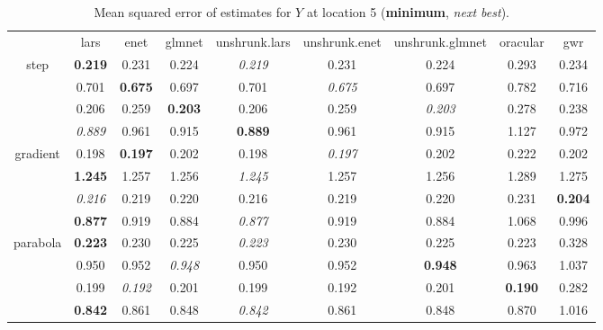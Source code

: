 \documentclass[authoryear, review, 11pt]{elsarticle}
\begin{document}
\begin{table}[ht]
\begin{center}
\begin{tabular}{ccccccccc}
  & lars & enet & glmnet & unshrunk.lars & unshrunk.enet & unshrunk.glmnet & oracular & gwr \\ 
  \cline{2-9}
  \multirow{4}{*}{step} & \textbf{0.219} & 0.231 & 0.224 & \emph{0.219} & 0.231 & 0.224 & 0.293 & 0.234 \\ 
  & 0.701 & \textbf{0.675} & 0.697 & 0.701 & \emph{0.675} & 0.697 & 0.782 & 0.716 \\ 
  & 0.206 & 0.259 & \textbf{0.203} & 0.206 & 0.259 & \emph{0.203} & 0.278 & 0.238 \\ 
  & \emph{0.889} & 0.961 & 0.915 & \textbf{0.889} & 0.961 & 0.915 & 1.127 & 0.972 \\ 
  \cline{2-9}
  \multirow{4}{*}{gradient} & 0.198 & \textbf{0.197} & 0.202 & 0.198 & \emph{0.197} & 0.202 & 0.222 & 0.202 \\ 
  & \textbf{1.245} & 1.257 & 1.256 & \emph{1.245} & 1.257 & 1.256 & 1.289 & 1.275 \\ 
  & \emph{0.216} & 0.219 & 0.220 & 0.216 & 0.219 & 0.220 & 0.231 & \textbf{0.204} \\ 
  & \textbf{0.877} & 0.919 & 0.884 & \emph{0.877} & 0.919 & 0.884 & 1.068 & 0.996 \\ 
  \cline{2-9}
  \multirow{4}{*}{parabola} & \textbf{0.223} & 0.230 & 0.225 & \emph{0.223} & 0.230 & 0.225 & 0.223 & 0.328 \\ 
  & 0.950 & 0.952 & \emph{0.948} & 0.950 & 0.952 & \textbf{0.948} & 0.963 & 1.037 \\ 
  & 0.199 & \emph{0.192} & 0.201 & 0.199 & 0.192 & 0.201 & \textbf{0.190} & 0.282 \\ 
  & \textbf{0.842} & 0.861 & 0.848 & \emph{0.842} & 0.861 & 0.848 & 0.870 & 1.016 \\ 
  \end{tabular}
\caption{Mean squared error of estimates for $Y$ at location 5 (\textbf{minimum}, \emph{next best}).\label{table:loc5-MSEY}}
\end{center}
\end{table}


	
\end{document}

